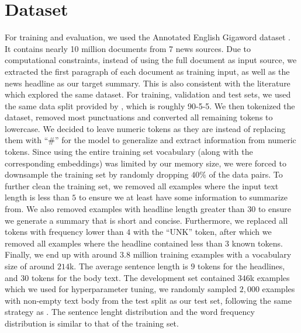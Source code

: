 \section{Dataset}
\label{sec: dataset}

For training and evaluation, we used the Annotated English Gigaword dataset \cite{graff2003english}. It contains nearly 10 million documents from 7 news sources. Due to computational constraints, instead of using the full document as input source, we extracted the first paragraph of each document as training input, as well as the news headline as our target summary. This is also consistent with the literature which explored the same dataset. For training, validation and test sets, we used the same data split provided by \cite{rush2015neural}, which is roughly 90-5-5. We then tokenized the dataset, removed most punctuations and converted all remaining tokens to lowercase. We decided to leave numeric tokens as they are instead of replacing them with ``$\#$'' for the model to generalize and extract information from numeric tokens. Since using the entire training set vocabulary (along with the corresponding embeddings) was limited by our memory size, we were forced to downsample the training set by randomly dropping $40\%$ of the data pairs. To further clean the training set, we removed all examples where the input text length is less than $5$ to ensure we at least have some information to summarize from. We also removed examples with headline length greater than $30$ to ensure we generate a summary that is short and concise. Furthermore, we replaced all tokens with frequency lower than $4$ with the ``UNK'' token, after which we removed all examples where the headline contained less than $3$ known tokens. Finally, we end up with around $3.8$ million training examples with a vocabulary size of around $214$k. The average sentence length is $9$ tokens for the headlines, and $30$ tokens for the body text.  The development set contained $346$k examples which we used for hyperparameter tuning, we randomly sampled $2,000$ examples with non-empty text body from the test split as our test set, following the same strategy as \cite{rush2015neural}. The sentence lenght distribution and the word frequency distribution is similar to that of the training set.